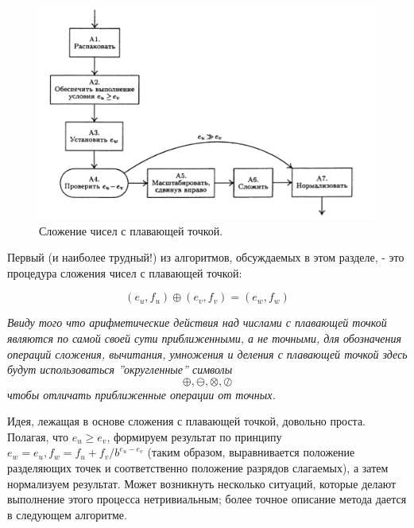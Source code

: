 \begin{figure}

\begin{center}
\includegraphics[scale=.9]{s}
\end{center}
\caption{Сложение чисел с плавающей точкой.}
\end{figure}


Первый (и наиболее трудный!) из алгоритмов, обсуждаемых в этом разделе, - это процедура сложения чисел с плавающей точкой:

\begin{equation}\label{f6}
(e_u,f_u) \oplus (e_v,f_v) = (e_w, f_w)
\end{equation}

\textit{Ввиду того что арифметические действия над числами с плавающей точкой являются по самой своей сути приближенными, а не точными, для обозначения операций сложения, вычитания, умножения и деления с плавающей точкой здесь будут использоваться ''округленные'' символы}
$$ \oplus, \ominus, \otimes, \oslash $$
\textit{чтобы отличать приближенные операции от точных.}

Идея, лежащая в основе сложения с плавающей точкой, довольно проста. Полагая, что $e_u \geqslant e_v$, формируем результат по принципу $e_w = e_u, f_w = f_u + f_v/b^{e_u-e_v}$ (таким образом, выравнивается положение разделяющих точек и соответственно положение разрядов слагаемых), а затем нормализуем результат. Может возникнуть несколько ситуаций, которые делают выполнение этого процесса нетривиальным; более точное описание метода дается в следующем алгоритме.

